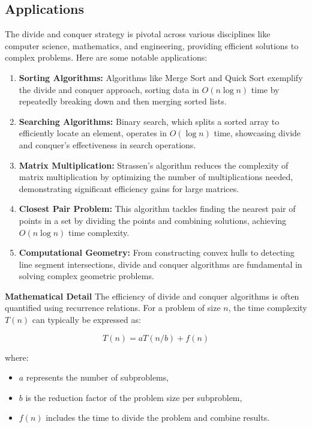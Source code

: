 \documentclass[12pt]{book} %
\begin{document}
\subsection{Applications}
The divide and conquer strategy is pivotal across various disciplines like computer science, mathematics, and engineering, providing efficient solutions to complex problems. Here are some notable applications:

\begin{enumerate}
    \item \textbf{Sorting Algorithms:} Algorithms like Merge Sort and Quick Sort exemplify the divide and conquer approach, sorting data in \(O(n \log n)\) time by repeatedly breaking down and then merging sorted lists.
    
    \item \textbf{Searching Algorithms:} Binary search, which splits a sorted array to efficiently locate an element, operates in \(O(\log n)\) time, showcasing divide and conquer’s effectiveness in search operations.
    
    \item \textbf{Matrix Multiplication:} Strassen's algorithm reduces the complexity of matrix multiplication by optimizing the number of multiplications needed, demonstrating significant efficiency gains for large matrices.
    
    \item \textbf{Closest Pair Problem:} This algorithm tackles finding the nearest pair of points in a set by dividing the points and combining solutions, achieving \(O(n \log n)\) time complexity.
    
    \item \textbf{Computational Geometry:} From constructing convex hulls to detecting line segment intersections, divide and conquer algorithms are fundamental in solving complex geometric problems.
\end{enumerate}

\textbf{Mathematical Detail}
The efficiency of divide and conquer algorithms is often quantified using recurrence relations. For a problem of size \(n\), the time complexity \(T(n)\) can typically be expressed as:

\[
T(n) = aT(n/b) + f(n)
\]

where:
\begin{itemize}
    \item \(a\) represents the number of subproblems,
    \item \(b\) is the reduction factor of the problem size per subproblem,
    \item \(f(n)\) includes the time to divide the problem and combine results.
\end{itemize}
\end{document}
